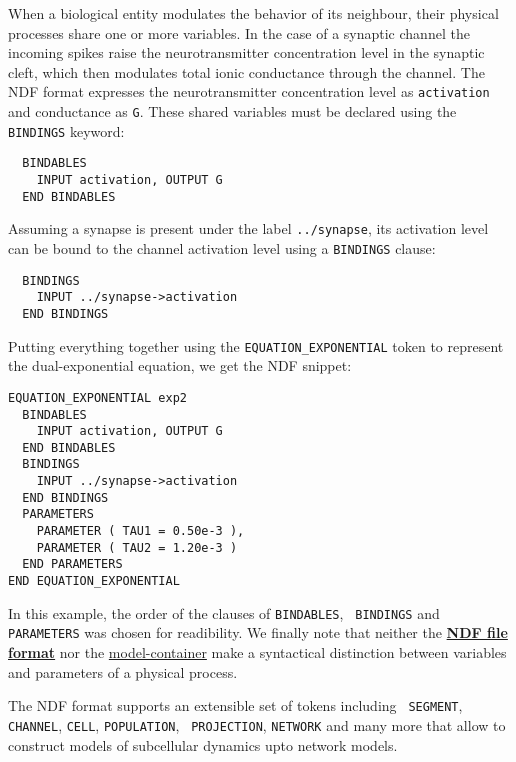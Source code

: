 \documentclass[12pt]{article}
\begin{document}
When a biological entity modulates the behavior of its neighbour,
their physical processes share one or more variables.  In the case of
a synaptic channel the incoming spikes raise the neurotransmitter
concentration level in the synaptic cleft, which then modulates total
ionic conductance through the channel.  The NDF format expresses the
neurotransmitter concentration level as {\tt activation} and
conductance as {\tt G}.  These shared variables must be declared using
the {\tt BINDINGS} keyword:
\begin{verbatim}
  BINDABLES
    INPUT activation, OUTPUT G
  END BINDABLES
\end{verbatim}
Assuming a synapse is present under the label {\tt ../synapse}, its
activation level can be bound to the channel activation level using a
{\tt BINDINGS} clause:
\begin{verbatim}
  BINDINGS
    INPUT ../synapse->activation
  END BINDINGS
\end{verbatim}

Putting everything together using the {\tt EQUATION\_EXPONENTIAL}
token to represent the dual-exponential equation, we get the NDF
snippet:
\begin{verbatim}
EQUATION_EXPONENTIAL exp2
  BINDABLES
    INPUT activation, OUTPUT G
  END BINDABLES
  BINDINGS
    INPUT ../synapse->activation
  END BINDINGS
  PARAMETERS
    PARAMETER ( TAU1 = 0.50e-3 ),
    PARAMETER ( TAU2 = 1.20e-3 )
  END PARAMETERS
END EQUATION_EXPONENTIAL
\end{verbatim}

In this example, the order of the clauses of {\tt BINDABLES}, {\tt
  BINDINGS} and {\tt PARAMETERS} was chosen for readibility.  We
finally note that neither the
\href{../ndf-file-format/ndf-file-format.tex}{\bf NDF file format} nor
the \href{../model-container/model-container.tex}{model-container}
make a syntactical distinction between variables and parameters of a
physical process.

The NDF format supports an extensible set of tokens including {\tt
  SEGMENT}, {\tt CHANNEL}, {\tt CELL}, {\tt POPULATION}, {\tt
  PROJECTION}, {\tt NETWORK} and many more that allow to construct
models of subcellular dynamics upto network models.
\end{document}

